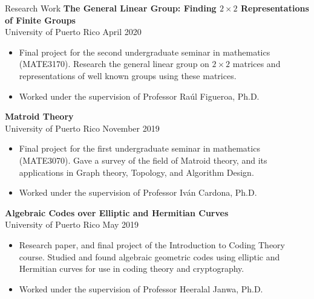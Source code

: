 \documentclass{resume} %
\begin{document}
\begin{rSection}{Research Work}
    \textbf{The General Linear Group: Finding $2 \times 2$
    Representations of Finite Groups} \\
    University of Puerto Rico \hfill{April 2020}
    \begin{itemize}
        \item Final project for the second undergraduate seminar in mathematics
            (MATE3170). Research the general linear group on $2 \times 2$
            matrices and representations of well known groups using these
            matrices.

        \item Worked under the supervision of Professor Ra\'ul Figueroa, Ph.D.
    \end{itemize}

    \textbf{Matroid Theory}  \\
    University of Puerto Rico \hfill{November 2019}
    \begin{itemize}
        \item Final project for the first undergraduate seminar in mathematics
            (MATE3070). Gave a survey of the field of Matroid theory, and its
            applications in Graph theory, Topology, and Algorithm Design.

        \item Worked under the supervision of Professor Iv\'an Cardona, Ph.D.
    \end{itemize}

    \textbf{Algebraic Codes over Elliptic and Hermitian
    Curves} \\
    University of Puerto Rico \hfill{May 2019}
    \begin{itemize}
        \item Research paper, and final project of the Introduction to Coding
            Theory course. Studied and found algebraic geometric codes using
            elliptic and Hermitian curves for use in coding theory and
            cryptography.

        \item Worked under the supervision of Professor Heeralal Janwa, Ph.D.
    \end{itemize}
\end{rSection}
\end{document}
